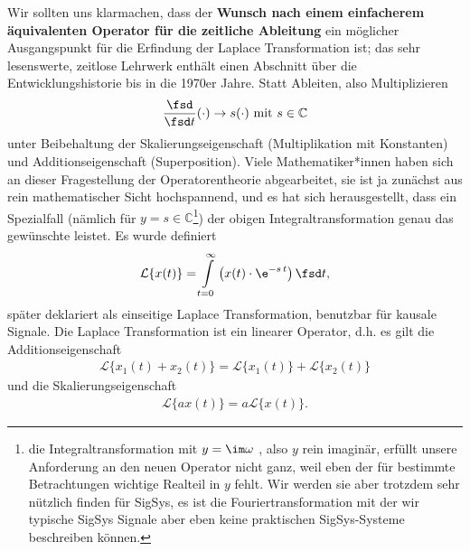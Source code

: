 Wir sollten uns klarmachen, dass der \textbf{Wunsch nach einem einfacherem äquivalenten
Operator für die zeitliche Ableitung} ein möglicher Ausgangspunkt für die
Erfindung der Laplace Transformation ist; das sehr lesenswerte,
zeitlose Lehrwerk \cite{LangeSigSys1} enthält
einen Abschnitt über die Entwicklungshistorie bis in die 1970er Jahre.
Statt Ableiten, also Multiplizieren
\begin{equation}
  \frac{\fsd }{\fsd t} (\cdot) \rightarrow s(\cdot ) \text{ mit } s \in \mathbb{C}
\end{equation}
unter Beibehaltung der Skalierungseigenschaft (Multiplikation mit Konstanten)
und Additionseigenschaft (Superposition).
%
Viele Mathematiker*innen haben sich an dieser Fragestellung der Operatorentheorie
abgearbeitet, sie ist ja zunächst aus rein mathematischer Sicht hochspannend, und
es hat sich herausgestellt, dass ein Spezialfall
(nämlich für $y=s\in\mathbb{C}$\footnote{die Integraltransformation mit $y=\im\omega$
, also $y$ rein imaginär, erfüllt unsere Anforderung an den neuen Operator nicht ganz,
weil eben der für bestimmte Betrachtungen wichtige Realteil in $y$ fehlt.
Wir werden sie aber trotzdem sehr nützlich finden
für SigSys, es ist die Fouriertransformation mit der wir typische SigSys Signale
aber eben keine praktischen SigSys-Systeme beschreiben können.})
der obigen
Integraltransformation genau das gewünschte leistet. Es wurde definiert
\begin{align}
\mathcal{L}\{x(t)\} = \int\limits_{t=0}^{\infty} \left(x(t) \cdot \e^{-s\,t} \right)\fsd t,
\end{align}
später deklariert als einseitige Laplace Transformation, benutzbar
für kausale Signale.
%
Die Laplace Transformation ist ein linearer Operator, d.h.
es gilt die Additionseigenschaft
\begin{align}
\mathcal{L}\{x_1(t)+x_2(t)\} = \mathcal{L}\{x_1(t)\} + \mathcal{L}\{x_2(t)\}
\end{align}
und die Skalierungseigenschaft
\begin{align}
\mathcal{L}\{a x(t)\} = a \mathcal{L}\{x(t)\}.
\end{align}

